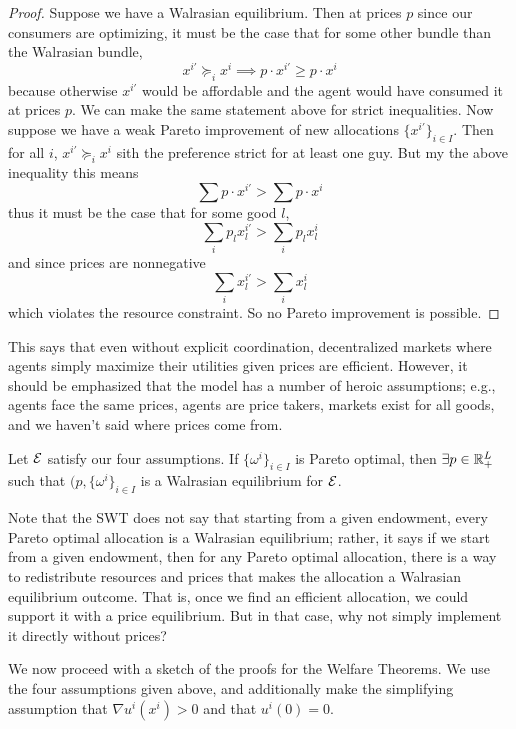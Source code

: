 \begin{proof}
  Suppose we have a Walrasian equilibrium. Then at prices $p$ since
  our consumers are optimizing, it must be the case that for some
  other bundle than the Walrasian bundle,
  \[
  x^{i'} \succeq_i x^i \implies p \cdot x^{i'} \geq p \cdot x^i
  \]
  because otherwise $x^{i'}$ would be affordable and the agent would
  have consumed it at prices $p$. We can make the same statement above
  for strict inequalities. Now suppose we have a weak Pareto
  improvement of new allocations $\{x^{i'}\}_{i \in I}$. Then for all
  $i$, $x^{i'} \succeq_i x^i$ sith the preference strict for at least
  one guy. But my the above inequality this means
  \[
  \sum p \cdot x^{i'} > \sum p \cdot x^i
  \]
  thus it must be the case that for some good $l$,
  \[
  \sum_i p_l x^{i'}_l > \sum_i p_l x^i_l
  \]
  and since prices are nonnegative
  \[
  \sum_i x^{i'}_l > \sum_i x^i_l
  \]
  which violates the resource constraint. So no Pareto improvement is
  possible.
\end{proof}

This says that even without explicit coordination, decentralized
markets where agents simply maximize their utilities given prices are
efficient. However, it should be emphasized that the model has a
number of heroic assumptions; e.g., agents face the same prices,
agents are price takers, markets exist for all goods, and we haven’t
said where prices come from.

\begin{theorem}
  Let ${\cal E}$ satisfy our four assumptions. If $\{\omega^i\}_{i \in
    I}$ is Pareto optimal, then $\exists p \in {\mathbb R}^L_+$ such that $(p,
  \{\omega^i\}_{i \in I}$ is a Walrasian equilibrium for ${\cal E}$.
\end{theorem}

Note that the SWT does not say that starting from a given endowment,
every Pareto optimal allocation is a Walrasian equilibrium; rather, it
says if we start from a given endowment, then for any Pareto optimal
allocation, there is a way to redistribute resources and prices that
makes the allocation a Walrasian equilibrium outcome. That is, once we
find an efficient allocation, we could support it with a price
equilibrium. But in that case, why not simply implement it directly
without prices?


We now proceed with a sketch of the proofs for the Welfare
Theorems. We use the four assumptions given above, and additionally
make the simplifying assumption that $\nabla u^i(x^i) > 0$ and that
$u^i(0) = 0$. 

